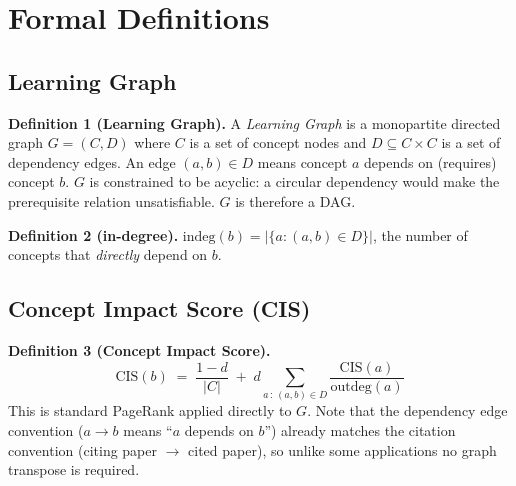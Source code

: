 
\section{Formal Definitions}
\label{sec:formal-definitions}

\subsection{Learning Graph}

\textbf{Definition 1 (Learning Graph).}
A \emph{Learning Graph} is a monopartite directed graph $G = (C, D)$ where $C$
is a set of concept nodes and $D \subseteq C \times C$ is a set of dependency
edges. An edge $(a, b) \in D$ means concept $a$ depends on (requires) concept
$b$. $G$ is constrained to be acyclic: a circular dependency would make the
prerequisite relation unsatisfiable. $G$ is therefore a DAG.


\textbf{Definition 2 (in-degree).}
$\mathrm{indeg}(b) = |\{a : (a,b) \in D\}|$, the number of concepts that
\emph{directly} depend on $b$.

\subsection{Concept Impact Score (CIS)}


\textbf{Definition 3 (Concept Impact Score).}
\[
\mathrm{CIS}(b) \;=\; \frac{1-d}{|C|} \;+\; d \sum_{a\,:\,(a,b)\in D} \frac{\mathrm{CIS}(a)}{\mathrm{outdeg}(a)}
\]
This is standard PageRank applied directly to $G$. Note that the dependency
edge convention ($a \to b$ means ``$a$ depends on $b$'') already matches the
citation convention (citing paper $\to$ cited paper), so unlike some
applications no graph transpose is required.

